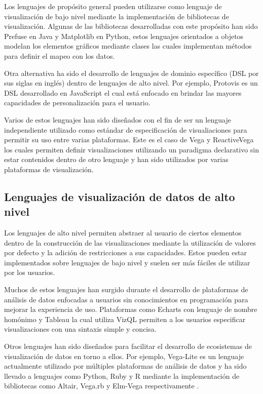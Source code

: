Los lenguajes de prop\'osito general pueden utilizarse como lenguaje de visualizaci\'on de bajo nivel
mediante la implementaci\'on de bibliotecas de visualizaci\'on. Algunas de las bibliotecas desarrolladas
con este prop\'osito han sido Prefuse \cite{heer2005prefuse} en Java y Matplotlib \cite{matplotlib} en Python,
estos lenguajes orientados a objetos modelan
los elementos gr\'aficos mediante clases las cuales implementan m\'etodos para definir el mapeo con los datos.

Otra alternativa ha sido el desarrollo de lenguajes
de dominio espec\'ifico (DSL por sus siglas en ingl\'es) dentro de lenguajes de alto nivel. Por ejemplo,
Protovis \cite{bostock2009protovis} es un DSL desarrollado en JavaScript 
el cual est\'a enfocado en brindar las mayores capacidades de personalizaci\'on para el usuario.

Varios de estos lenguajes han sido dise\~nados con el fin de ser un lenguaje independiente utilizado como est\'andar
de especificaci\'on de visualiaciones para permitir su uso entre varias plataformas. Este es el caso de
Vega \cite{vegaLang} y ReactiveVega \cite{satyanarayan2015reactive} los cuales permiten definir visualizaciones utilizando
un paradigma declarativo sin estar contenidos dentro de otro lenguaje y han sido utilizados por varias plataformas de
visualizaci\'on.

\subsection{Lenguajes de visualizaci\'on de datos de alto nivel}
Los lenguajes de alto nivel permiten abstraer al usuario de ciertos elementos dentro de la construcci\'on
de las visualizaciones mediante la utilizaci\'on de valores por defecto y la adici\'on de restricciones a sus capacidades. Estos pueden
estar implementados sobre lenguajes de bajo nivel y suelen ser m\'as f\'aciles de utilizar por los usuarios.

Muchos de estos lenguajes han surgido durante el desarrollo de plataformas
de an\'alisis de datos enfocadas a usuarios sin conocimientos en programaci\'on para mejorar la experiencia de uso. 
Plataformas como Echarts con lenguaje de nombre hom\'onimo \cite{li2018echarts} y Tableau la cual utiliza VizQL \cite{hanrahan2006vizql}
permiten a los usuarios especificar visualizaciones con una sintaxis simple y concisa.

Otros lenguajes han sido dise\~nados para facilitar el desarrollo de ecosistemas de
visualizaci\'on de datos en torno a ellos. Por ejemplo, Vega-Lite \cite{satyanarayan2016vega} es un lenguaje actualmente utilizado
por m\'ultiples plataformas de an\'alisis de datos y ha sido llevado a lenguajes como Python, Ruby y R mediante
la implementaci\'on de bibliotecas como Altair, Vega.rb y Elm-Vega respectivamente \cite{vegaEco}.

